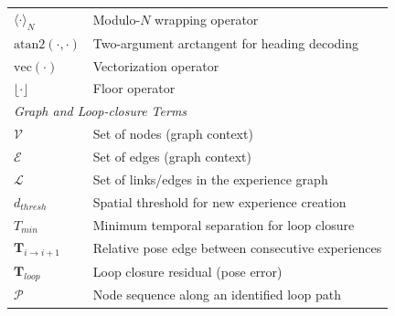 {\begin{longtable}{p{}p{}}
            $\langle \cdot \rangle_{N}$                                 & Modulo-$N$ wrapping operator                                         \\
            $\mathrm{atan2}(\cdot,\cdot)$                               & Two-argument arctangent for heading decoding                         \\
            $\mathrm{vec}(\cdot)$                                       & Vectorization operator                                               \\
            $\lfloor \cdot \rfloor$                                     & Floor operator                                                       \\
            \midrule
            \multicolumn{2}{l}{\textit{Graph and Loop-closure Terms}}                                                                          \\
            $\mathcal{V}$                                               & Set of nodes (graph context)                                         \\
            $\mathcal{E}$                                               & Set of edges (graph context)                                         \\
            $\mathcal{L}$                                               & Set of links/edges in the experience graph                           \\
            $d_{thresh}$                                                & Spatial threshold for new experience creation                        \\
            $T_{min}$                                                   & Minimum temporal separation for loop closure                         \\
            $\mathbf{T}_{i \to i+1}$                                    & Relative pose edge between consecutive experiences                   \\
            $\mathbf{T}_{loop}$                                         & Loop closure residual (pose error)                                   \\
            $\mathcal{P}$                                               & Node sequence along an identified loop path                          \\
            \bottomrule
        \end{longtable}
    }

\FloatBarrier

